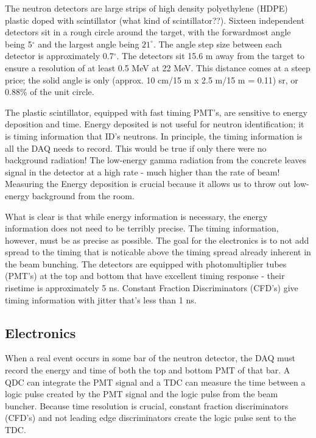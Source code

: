 The neutron detectors are large strips of high density polyethylene (HDPE) plastic doped with scintillator (what kind of scintillator??).  Sixteen independent detectors sit in a rough circle around the target, with the forwardmost angle being 5$^{\circ}$ and the largest angle being $21^{\circ}$.  The angle step size between each detector is approximately 0.7$^{\circ}$.  The detectors sit 15.6 m away from the target to ensure a resolution of at least 0.5 MeV at 22 MeV.  This distance comes at a steep price; the solid angle is only (approx. 10 cm/15 m x 2.5 m/15 m = 0.11) sr, or 0.88\% of the unit circle.


The plastic scintillator, equipped with fast timing PMT's, are sensitive to energy deposition and time.  Energy deposited is not useful for neutron identification; it is timing information that ID's neutrons.  In principle, the timing information is all the DAQ needs to record.  This would be true if only there were no background radiation!  The low-energy gamma radiation from the concrete leaves signal in the detector at a high rate - much higher than the rate of beam! Measuring the Energy deposition is crucial because it allows us to throw out low-energy background from the room.  

What is clear is that while energy information is necessary, the energy information does not need to be terribly precise.  The timing information, however, must be as precise as possible.  The goal for the electronics is to not add spread to the timing that is noticable above the timing spread already inherent in the beam bunching.  The detectors are equipped with photomultiplier tubes (PMT's) at the top and bottom that have excellent timing response - their risetime is approximately 5 ns.  Constant Fraction Discriminators (CFD's) give timing information with jitter that's less than 1 ns.

\subsection{Electronics}
When a real event occurs in some bar of the neutron detector, the DAQ must record the energy and time of both the top and bottom PMT of that bar.  A QDC can integrate the PMT signal and a TDC can measure the time between a logic pulse created by the PMT signal and the logic pulse from the beam buncher.  Because time resolution is crucial, constant fraction discriminators (CFD's) and not leading edge discriminators create the logic pulse sent to the TDC.  

